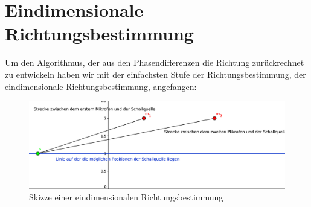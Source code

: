 \section{Eindimensionale Richtungsbestimmung} 
  Um den Algorithmus, der aus den Phasendifferenzen die Richtung zurückrechnet zu entwickeln haben wir mit der
einfachsten Stufe der Richtungsbestimmung, der eindimensionale Richtungsbestimmung, angefangen:
\begin{figure}[H]
  \centering
  \includegraphics[width=\linewidth]{img/skizze}
  \caption{Skizze einer eindimensionalen Richtungsbestimmung}
\label{fig:skizz1d}
\end{figure}


